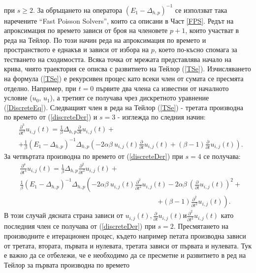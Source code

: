 \documentclass[a4paper]{article}
\newcommand{\rf}[1]{(\ref{#1})}
\theoremstyle{remark}
\begin{document}
при $s \ge 2$. За обръщането на оператора $(E_1-\Delta_{h,p})^{-1}$ се използват така наречените ``Fast Poisson Solvers'', които са описани в Част \ref{FPS}. Редът на апроксимация по времето зависи от броя на членовете $p+1$, които участват в реда на Тейлор. По този начин реда на апроксимация по времето и пространството е еднакъв и зависи от избора на $p$, което по-късно спомага за тестването на сходимостта. Всяка точка от мрежата представлява начало на крива, чиято траектория се описва с развитието на Тейлор \rf{TSe}. Изчисляването на формула \rf{TSe} е рекурсивен процес като всеки член от сумата се пресмята отделно. Например, при $t=0$ първите два члена са известни от началното условие ($u_0$, $u_1$), а третият се получава чрез дискретното уравнение \rf{DiscreteEq}.  Следващият член в реда на Тейлор \rf{TSe} - третата производна по времето от \rf{discreteDer} и $s=3$ - изглежда по следния начин:
\begin{align} \label{der3}
 &\frac{\partial^3}{\partial t^3}u_{i,j}(t) = \frac{1}{\beta}\Delta_{h,p} \frac{\partial}{\partial t}u_{i, j}(t) + \nonumber\\
&+ \frac{1}{\beta} (E_1-\Delta_{h,p})^{-1}\Delta_{h,p} \left( -2 \alpha \beta \: u_{i, j}(t) \frac{\partial}{\partial t}u_{i, j}(t) +  (\beta-1) \frac{\partial}{\partial t} u_{i, j}(t) \right).
\end{align}
За четвъртата производна по времето от \rf{discreteDer} при $s=4$ се получава:
\begin{align} \label{der4}
&\frac{\partial^4}{\partial t^4}u_{i,j}(t) = \frac{1}{\beta}\Delta_{h,p} \frac{\partial^2}{\partial t^2}u_{i, j}(t) +   \nonumber\\
& \frac{1}{\beta}(E_1-\Delta_{h,p})^{-1}\Delta_{h,p} \left( -2 \alpha \beta \:  u_{i, j}(t)\frac{\partial^2}{\partial t^2}u_{i, j}(t) -2 \alpha \beta \: \left( \frac{\partial}{\partial t}u_{i, j}(t) \right)^2 + \right. \nonumber\\
&\quad \quad \quad \quad \quad \quad \quad \quad \quad \quad \quad \quad \quad \quad \quad \quad \quad \quad \quad \quad \left. +  (\beta-1) \frac{\partial^2}{\partial t^2} u_{i, j}(t) \right) .
\end{align}
В този случай дясната страна зависи от $u_{i, j}(t), \frac{\partial}{\partial t}u_{i, j}(t) и \frac{\partial^2}{\partial t^2}u_{i, j}(t)$ като последния член се получава от \rf{discreteDer} при $s=2$. Пресмятането на производните е итерационен процес, където например петата производна зависи от третата, втората, първата и нулевата, третата зависи от първата и нулевата. Тук е важно да се отбележи, че е необходимо да се пресметне и развитието в ред на Тейлор за първата производна по времето
\end{document}
